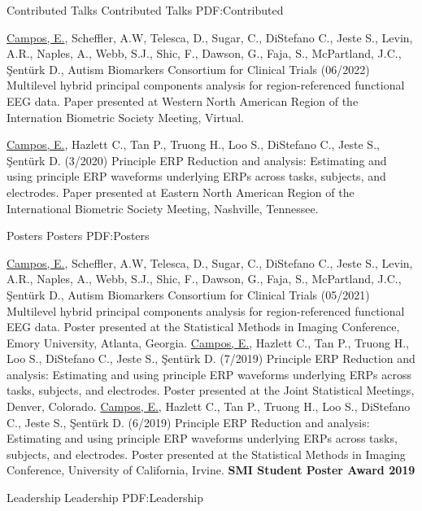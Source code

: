 \documentclass[letterpaper,MMMyyyy,nonstopmode]{simpleresumecv}
\begin{document}
\begin{Body}
\BigGap
\SubSection
{Contributed Talks}
{Contributed Talks}
{PDF:Contributed}

\BigGap 
\BulletItem 
\underline{Campos, E.}, Scheffler, A.W, Telesca, D., Sugar, C., DiStefano C., Jeste S., Levin, A.R., Naples, A., Webb, S.J., Shic, F., Dawson, G., Faja, S., McPartland, J.C., \c{S}ent\"{u}rk D., Autism Biomarkers Consortium for Clinical Trials (06/2022) Multilevel hybrid principal components analysis for region-referenced functional EEG data. Paper presented at Western North American Region of the Internation Biometric Society Meeting, Virtual.

\BigGap
\BulletItem
\underline{Campos, E.}, Hazlett C., Tan P., Truong H., Loo S., DiStefano C., Jeste S., \c{S}ent\"{u}rk D. (3/2020) Principle ERP Reduction and analysis: Estimating and using principle ERP waveforms underlying ERPs across tasks, subjects, and electrodes. Paper presented at Eastern North American Region of the International Biometric Society Meeting, Nashville, Tennessee.


\BigGap
\SubSection
{Posters}
{Posters}
{PDF:Posters}

\BigGap 
\BulletItem 
\underline{Campos, E.}, Scheffler, A.W, Telesca, D., Sugar, C., DiStefano C., Jeste S., Levin, A.R., Naples, A., Webb, S.J., Shic, F., Dawson, G., Faja, S., McPartland, J.C., \c{S}ent\"{u}rk D., Autism Biomarkers Consortium for Clinical Trials (05/2021) Multilevel hybrid principal components analysis for region-referenced functional EEG data. Poster presented at the Statistical Methods in Imaging Conference, Emory University, Atlanta, Georgia.
\BigGap 
\BulletItem 
\underline{Campos, E.}, Hazlett C., Tan P., Truong H., Loo S., DiStefano C., Jeste S., \c{S}ent\"{u}rk D. (7/2019) Principle ERP Reduction and analysis: Estimating and using principle ERP waveforms underlying ERPs across tasks, subjects, and electrodes. Poster presented at the Joint Statistical Meetings, Denver, Colorado.
\BigGap
\BulletItem 
\underline{Campos, E.}, Hazlett C., Tan P., Truong H., Loo S., DiStefano C., Jeste S., \c{S}ent\"{u}rk D. (6/2019) Principle ERP Reduction and analysis: Estimating and using principle ERP waveforms underlying ERPs across tasks, subjects, and electrodes. Poster presented at the Statistical Methods in Imaging Conference, University of California, Irvine. \textbf{SMI Student Poster Award 2019}



\Section
{Leadership}
{Leadership}
{PDF:Leadership}


\end{Body}
\end{document}
